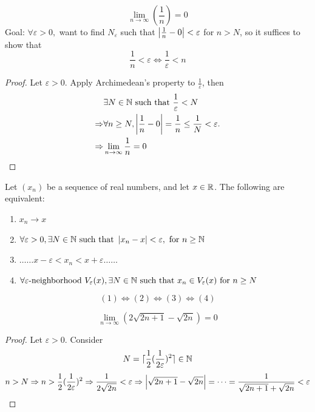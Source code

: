 \documentclass[a4paper,12pt]{article}
\begin{document}
\begin{example}
    \[\lim_{n\to \infty}(\frac{1}{n}) = 0\]
    Goal: \(\forall \varepsilon>0,\) want to find \(N_\varepsilon\) such that \(\left\lvert \frac{1}{n}-0\right\rvert < \varepsilon\) for \(n>N\), 
    so it suffices to show that \\
    \[\frac{1}{n}<\varepsilon \Leftrightarrow \frac{1}{\varepsilon} < n\]
\end{example}

\begin{proof}
    Let \(\varepsilon>0\). Apply Archimedean's property to \(\frac{1}{\varepsilon}\), then
    \begin{align*}
        & \exists N\in \mathbb{N} \text{ such that }\frac{1}{\varepsilon}<N \\
        \Rightarrow & \forall n \ge N, \left\lvert \frac{1}{n}-0\right\rvert = \frac{1}{n}\le \frac{1}{N} < \varepsilon.\\
        \Rightarrow & \lim_{n \to \infty}\frac{1}{n} = 0
    \end{align*}
\end{proof}
\newpage
\begin{theorem}
    Let \((x_n)\) be a sequence of real numbers, and let \(x \in \mathbb{R}\). The following are equivalent:
\begin{enumerate}
    \item \(x_n \rightarrow x\)
    \item \(\forall \varepsilon > 0, \exists N \in \mathbb{N} \text{ such that } \left\lvert x_n-x\right\rvert<\varepsilon,\text{ for }n\ge \mathbb{N} \)
    \item \(\dots \dots x - \varepsilon<x_n<x+\varepsilon\dots\dots\)
    \item \(\forall\varepsilon\text{-neighborhood } V_\varepsilon(x),\exists N \in \mathbb{N} \text{ such that } x_n \in V_\varepsilon(x) \text{ for } n\ge N\)\\
\end{enumerate}
\[(1)\Leftrightarrow(2)\Leftrightarrow(3)\Leftrightarrow(4)\]
\end{theorem}

\begin{proposition}
    \[\lim_{n\to \infty}(2\sqrt{2n+1}-\sqrt{2n})=0\]
\end{proposition}

\begin{proof}
    Let \(\varepsilon > 0\). Consider \[N = \lceil\frac{1}{2}(\frac{1}{2\varepsilon})^2\rceil\in\mathbb{N}\]
    \[n>N\Rightarrow n>\frac{1}{2}(\frac{1}{2\varepsilon})^2 \Rightarrow \frac{1}{2\sqrt{2n}}<\varepsilon\Rightarrow\left\lvert \sqrt{2n+1}-\sqrt{2n}\right\rvert = \dots = \frac{1}{\sqrt{2n+1}+\sqrt{2n}}<\varepsilon\]
\end{proof}
\end{document}

